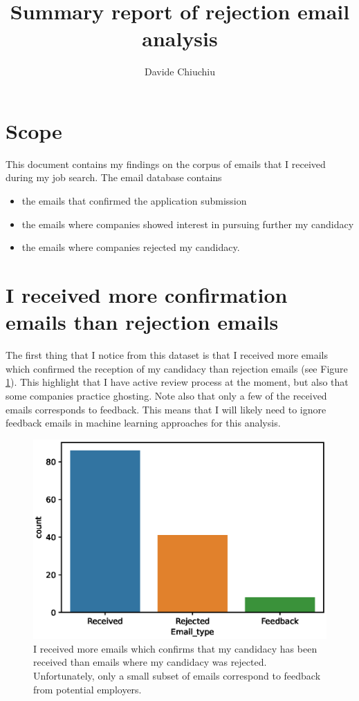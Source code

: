 \documentclass[12pt]{article}
\begin{document}
\title{Summary report of rejection email analysis}
\author{Davide Chiuchiu}

\maketitle

\section{Scope}
This document contains my findings on the corpus of emails that I received during my job search. The email database contains 
\begin{itemize}
	\item the emails that confirmed the application submission
	\item the emails where companies showed interest in pursuing further my candidacy
	\item the emails where companies rejected my candidacy.
\end{itemize}

\section{I received more confirmation emails than rejection emails}
The first thing that I notice from this dataset is that I received more emails which confirmed the reception of my candidacy than rejection emails (see Figure \ref{fig:email_type_distribution}). This highlight that I have active review process at the moment, but also that some companies practice ghosting. Note also that only a few of the received emails corresponds to feedback. This means that I will likely need to ignore feedback emails in machine learning approaches for this analysis.

\begin{figure}[tb!]
	\center
	\includegraphics[width = 0.5\linewidth]{email_type_distribution.eps}
	\caption{I received more emails which confirms that my candidacy has been received than  emails where my candidacy was rejected. Unfortunately, only a small subset of emails correspond to feedback from potential employers. \label{fig:email_type_distribution}}
\end{figure}
\end{document}

